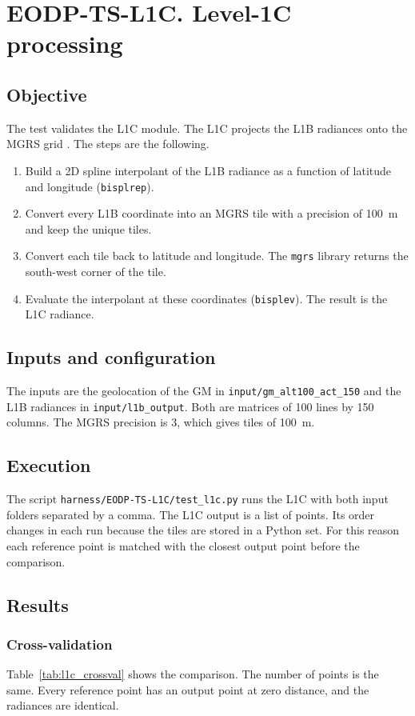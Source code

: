 \section{EODP-TS-L1C. Level-1C processing}
\label{sec:l1c}

\subsection{Objective}
The test validates the L1C module.
The L1C projects the L1B radiances onto the MGRS grid \cite{atbd}. The steps are the following.
\begin{enumerate}
\item Build a 2D spline interpolant of the L1B radiance as a function of latitude and longitude (\texttt{bisplrep}).
\item Convert every L1B coordinate into an MGRS tile with a precision of 100~m and keep the unique tiles.
\item Convert each tile back to latitude and longitude. The \texttt{mgrs} library \cite{mgrs} returns the south-west corner of the tile.
\item Evaluate the interpolant at these coordinates (\texttt{bisplev}). The result is the L1C radiance.
\end{enumerate}

\subsection{Inputs and configuration}
The inputs are the geolocation of the GM in \texttt{input/gm\_alt100\_act\_150} and the L1B radiances in \texttt{input/l1b\_output}.
Both are matrices of 100 lines by 150 columns.
The MGRS precision is 3, which gives tiles of 100~m.

\subsection{Execution}
The script \texttt{harness/EODP-TS-L1C/test\_l1c.py} runs the L1C with both input folders separated by a comma.
The L1C output is a list of points. Its order changes in each run because the tiles are stored in a Python set.
For this reason each reference point is matched with the closest output point before the comparison.

\subsection{Results}

\subsubsection{Cross-validation}
Table~\ref{tab:l1c_crossval} shows the comparison.
The number of points is the same. Every reference point has an output point at zero distance, and the radiances are identical.

